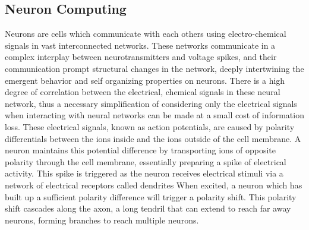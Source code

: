 \subsection{Neuron Computing}
Neurons are cells which communicate with each others using electro-chemical
signals in vast interconnected networks.
These networks communicate in a complex interplay between neurotransmitters and voltage
spikes, and their communication prompt structural changes in the network,
deeply intertwining the emergent behavior and self organizing properties on neurons.
There is a high degree of correlation between the electrical, chemical signals
in these neural network, thus a necessary simplification of considering only the
electrical signals when interacting with neural networks can be made at a small
cost of information loss.
These electrical signals, known as action potentials, are caused
by polarity differentials between the ions inside and the ions outside of the
cell membrane.
A neuron maintains this potential difference by transporting ions of opposite
polarity through the cell membrane, essentially preparing a spike of electrical
activity.
This spike is triggered as the neuron receives electrical stimuli via a network
of electrical receptors called dendrites
When excited, a neuron which has built up a sufficient polarity difference will
trigger a polarity shift.
This polarity shift cascades along the axon, a long tendril that can extend to
reach far away neurons, forming branches to reach multiple neurons.
